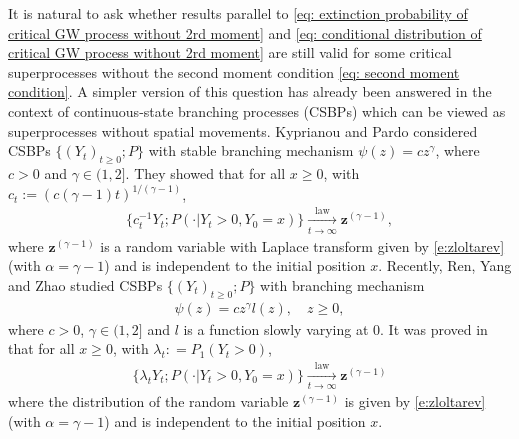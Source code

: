 \documentclass[12pt,a4paper]{amsart}
\theoremstyle{definition}
\numberwithin{equation}{section}
\begin{document}
It is natural to ask whether results parallel to \eqref{eq: extinction probability of critical GW process without 2rd moment} and \eqref{eq: conditional distribution of critical GW process without 2rd moment} are still valid for some critical superprocesses without the second moment condition \eqref{eq: second moment condition}.
A simpler version of this question has already been answered in the context of continuous-state branching processes	(CSBPs) which can be viewed as superprocesses without spatial movements.
Kyprianou and Pardo \cite{Kyprianou2008Continuous} considered CSBPs $\{(Y_t)_{t\geq 0}; P\}$ with stable branching mechanism $\psi(z) =c z^\gamma$, where $c > 0$ and $\gamma \in (1,2]$.
They showed that for all $x\geq 0$, with $c_t := (c(\gamma - 1)t)^{1/(\gamma - 1)}$,
\begin{align} \label{eq: conditional limit of CSBP with stable branching}
	\{c_t^{-1}Y_t; P( \cdot |Y_t > 0,Y_0 = x)\}
	\xrightarrow[t\to \infty]{\operatorname{law}} \mathbf z^{(\gamma - 1)},
\end{align}
where $\mathbf z^{(\gamma - 1)}$ is a random variable with Laplace transform given by \eqref{e:zloltarev} (with $\alpha=\gamma-1$) and is independent to the initial position $x$.
Recently, Ren, Yang and Zhao \cite{RenYangZhao2014Conditional} studied CSBPs $\{(Y_t)_{t\ge 0}; P\}$ with branching mechanism
\begin{align}\label{eq: regular varing of branching mechanism of a CSBP}
	\psi(z)
	= c z^\gamma l(z),
	\quad z\geq 0,
\end{align}
where $c > 0$, $\gamma \in (1,2]$ and $l$ is a function slowly varying  at $0$.
It was proved in  \cite{RenYangZhao2014Conditional} that for all $x\geq 0$, with $\lambda_t: = P_1(Y_t > 0)$,
\begin{align}\label{eq: conditional limit of CSBP}
	\{ \lambda_t Y_t ; P(\cdot | Y_t > 0, Y_0 = x)\}
  \xrightarrow[t\to \infty]{\operatorname{law}} \mathbf z^{(\gamma - 1)}
\end{align}
where the distribution of the random variable $\mathbf z^{(\gamma - 1)}$ is given by \eqref{e:zloltarev} (with $\alpha=\gamma-1$) and is independent to the initial position $x$.
\end{document}
